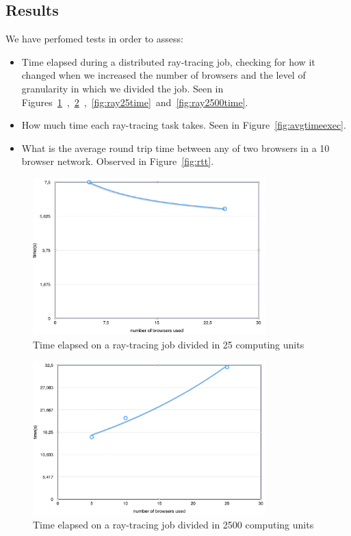 \subsection{Results}

We have perfomed tests in order to assess:

\begin{itemize}
    \item Time elapsed during a distributed ray-tracing job, checking for how it changed when we increased the number of browsers and the level of granularity in which we divided the job. Seen in Figures~\ref{fig:ray25}~,~\ref{fig:ray2500}~,~\ref{fig:ray25time}~and~\ref{fig:ray2500time}.
    \item How much time each ray-tracing task takes. Seen in Figure~\ref{fig:avgtimeexec}.
    \item What is the average round trip time between any of two browsers in a 10 browser network. Observed in Figure~\ref{fig:rtt}.
\end{itemize}

\begin{figure}[h!]
  \centering
  \includegraphics[width=0.8\textwidth]{figs/2.png}
  \caption{Time elapsed on a ray-tracing job divided in 25 computing units}
  \label{fig:ray25}
\end{figure}

\begin{figure}[h!]
  \centering
  \includegraphics[width=0.8\textwidth]{figs/1.png}
  \caption{Time elapsed on a ray-tracing job divided in 2500 computing units}
  \label{fig:ray2500}
\end{figure}

